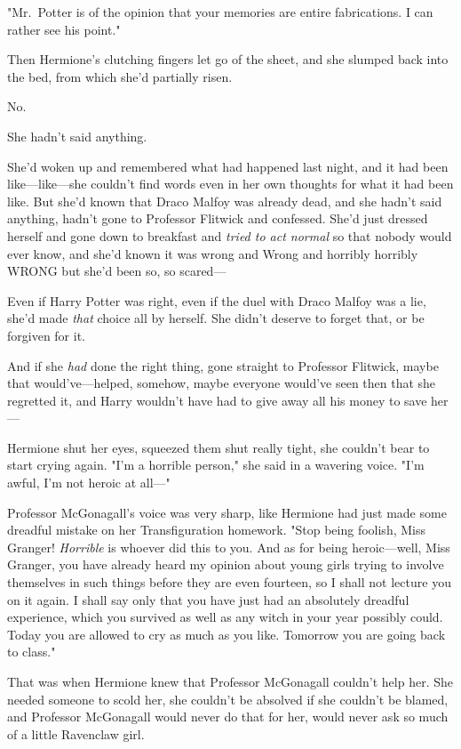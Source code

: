 "Mr.~Potter is of the opinion that your memories are entire fabrications. I can
rather see his point."

Then Hermione's clutching fingers let go of the sheet, and she slumped back
into the bed, from which she'd partially risen.

No.

She hadn't said anything.

She'd woken up and remembered what had happened last night, and it had been
like---like---she couldn't find words even in her own thoughts for what it had
been like. But she'd known that Draco Malfoy was already dead, and she hadn't
said anything, hadn't gone to Professor Flitwick and confessed. She'd just
dressed herself and gone down to breakfast and \emph{tried to act normal} so
that nobody would ever know, and she'd known it was wrong and Wrong and
horribly horribly WRONG but she'd been so, so scared---

Even if Harry Potter was right, even if the duel with Draco Malfoy was a lie,
she'd made \emph{that} choice all by herself. She didn't deserve to forget
that, or be forgiven for it.

And if she \emph{had} done the right thing, gone straight to Professor
Flitwick, maybe that would've---helped, somehow, maybe everyone would've seen
then that she regretted it, and Harry wouldn't have had to give away all his
money to save her---

Hermione shut her eyes, squeezed them shut really tight, she couldn't bear to
start crying again. "I'm a horrible person," she said in a wavering voice. "I'm
awful, I'm not heroic at all\mbox{---}"

Professor McGonagall's voice was very sharp, like Hermione had just made some
dreadful mistake on her Transfiguration homework. "Stop being foolish, Miss
Granger! \emph{Horrible} is whoever did this to you. And as for being
heroic---well, Miss Granger, you have already heard my opinion about young
girls trying to involve themselves in such things before they are even
fourteen, so I shall not lecture you on it again. I shall say only that you
have just had an absolutely dreadful experience, which you survived as well as
any witch in your year possibly could. Today you are allowed to cry as much as
you like. Tomorrow you are going back to class."

That was when Hermione knew that Professor McGonagall couldn't help her. She
needed someone to scold her, she couldn't be absolved if she couldn't be
blamed, and Professor McGonagall would never do that for her, would never ask
so much of a little Ravenclaw girl.

